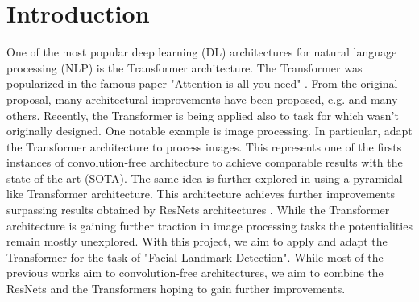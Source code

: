 \section{Introduction}\label{sects:introduction}

One of the most popular deep learning (DL) architectures for natural language processing (NLP) is the Transformer architecture. The Transformer was popularized in the famous paper "Attention is all you need" \cite{Vaswani17}. From the original proposal, many architectural improvements have been proposed, e.g. \cite{Devlin18, Liu19, Yang19} and many others. Recently, the Transformer is being applied also to task for which wasn't originally designed. One notable example is image processing. In particular, \cite{Dosovitskiy20} adapt the Transformer architecture to process images. This represents one of the firsts instances of convolution-free architecture to achieve comparable results with the state-of-the-art (SOTA). The same idea is further explored in \cite{Wang21} using a pyramidal-like Transformer architecture. This architecture achieves further improvements surpassing results obtained by ResNets architectures \cite{He16}. While the Transformer architecture is gaining further traction in image processing tasks the potentialities remain mostly unexplored. With this project, we aim to apply and adapt the Transformer for the task of "Facial Landmark Detection". While most of the previous works aim to convolution-free architectures, we aim to combine the ResNets and the Transformers hoping to gain further improvements.

